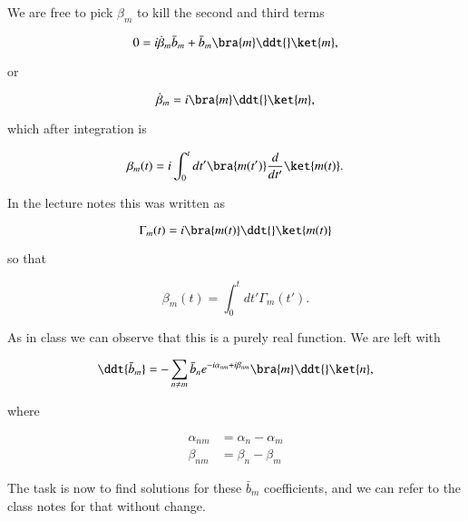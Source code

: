 We are free to pick $\beta_m$ to kill the second and third terms

\begin{equation}\label{eqn:adiabaticPertTakeII:130}
0 =
i \dot{\beta}_m \bar{b}_m
+ 
\bar{b}_m \bra{m} \ddt{} \ket{m},
\end{equation}

or

\begin{equation}\label{eqn:adiabaticPertTakeII:150}
\dot{\beta}_m 
= 
i \bra{m} \ddt{} \ket{m},
\end{equation}

which after integration is

\begin{equation}\label{eqn:adiabaticPertTakeII:170}
\beta_m(t)
= 
i \int_0^t dt' \bra{m(t')} \frac{d}{dt'} \ket{m(t)}.
\end{equation}

In the lecture notes this was written as

\begin{equation}\label{eqn:adiabaticPertTakeII:150b}
\Gamma_m(t) = i \bra{m(t)} \ddt{} \ket{m(t)}
\end{equation}

so that

\begin{equation}\label{eqn:adiabaticPertTakeII:150c}
\beta_m(t) = \int_0^t dt' \Gamma_m(t').
\end{equation}

As in class we can observe that this is a purely real function.  We are left with

\begin{equation}\label{eqn:adiabaticPertTakeII:190}
\ddt{\bar{b}_m}
=
-
\sum_{n \ne m} \bar{b}_n 
e^{-i \alpha_{nm} + i \beta_{nm}}
\bra{m} \ddt{} \ket{n} 
,
\end{equation}

where

\begin{align}\label{eqn:adiabaticPertTakeII:210}
\alpha_{nm} &= \alpha_{n} -\alpha_m \\
\beta_{nm} &= \beta_{n} -\beta_m 
\end{align}

The task is now to find solutions for these $\bar{b}_m$ coefficients, and we can refer to the class notes for that without change.

\EndArticle
